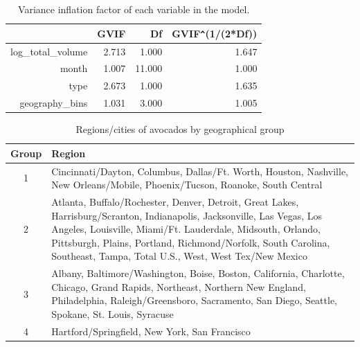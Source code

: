 \documentclass[11pt]{article}\usepackage[]{graphicx}\usepackage[]{color}
\begin{document}
\begin{center}
\begin{table}[ht]
\centering
\begin{tabular}{rrrr}
  \hline
 & GVIF & Df & GVIF\verb|^|(1/(2*Df)) \\ 
  \hline
log\_total\_volume & 2.713 & 1.000 & 1.647 \\ 
  month & 1.007 & 11.000 & 1.000 \\ 
  type & 2.673 & 1.000 & 1.635 \\ 
  geography\_bins & 1.031 & 3.000 & 1.005 \\ 
   \hline
\end{tabular}
\caption{Variance inflation factor of each variable in the model.} 
\label{vif_table}
\end{table}

\end{center} 
\hfill \break


\begin{center}
\begin{table}[ht]
\centering
\begin{tabular}{cp{5in}}
  \hline
Group & Region \\ 
  \hline
1 & Cincinnati/Dayton, Columbus, Dallas/Ft. Worth, Houston, Nashville, New Orleans/Mobile, Phoenix/Tucson, Roanoke, South Central \\ 
  2 & Atlanta, Buffalo/Rochester, Denver, Detroit, Great Lakes, Harrisburg/Scranton, Indianapolis, Jacksonville, Las Vegas, Los Angeles, Louisville, Miami/Ft. Lauderdale, Midsouth, Orlando, Pittsburgh, Plains, Portland, Richmond/Norfolk, South Carolina, Southeast, Tampa, Total U.S., West, West Tex/New Mexico \\ 
  3 & Albany, Baltimore/Washington, Boise, Boston, California, Charlotte, Chicago, Grand Rapids, Northeast, Northern New England, Philadelphia, Raleigh/Greensboro, Sacramento, San Diego, Seattle, Spokane, St. Louis, Syracuse \\ 
  4 & Hartford/Springfield, New York, San Francisco \\ 
   \hline
\end{tabular}
\caption{Regions/cities of avocados by geographical group} 
\label{region}
\end{table}

\end{center} 
\end{document}
